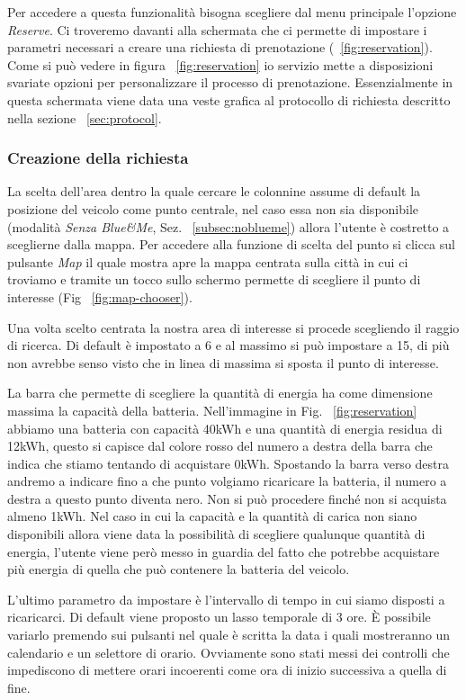 Per accedere a questa funzionalità bisogna scegliere dal menu principale l'opzione \emph{Reserve}. Ci troveremo davanti alla schermata che ci permette di impostare i parametri necessari a creare una richiesta di prenotazione (~\ref{fig:reservation}). Come si può vedere in figura ~\ref{fig:reservation} io servizio mette a disposizioni svariate opzioni per personalizzare il processo di prenotazione. Essenzialmente in questa schermata viene data una veste grafica al protocollo di richiesta descritto nella sezione ~\ref{sec:protocol}.

\subsubsection{Creazione della richiesta}

La scelta dell'area dentro la quale cercare le colonnine assume di default la posizione del veicolo come punto centrale, nel caso essa non sia disponibile (modalità \emph{Senza Blue\&{}Me}, Sez. ~\ref{subsec:noblueme}) allora l'utente è costretto a sceglierne dalla mappa. Per accedere alla funzione di scelta del punto si clicca sul pulsante \emph{Map} il quale mostra apre la mappa centrata sulla città in cui ci troviamo e tramite un tocco sullo schermo permette di scegliere il punto di interesse (Fig ~\ref{fig:map-chooser}).

Una volta scelto centrata la nostra area di interesse si procede scegliendo il raggio di ricerca. Di default è impostato a 6 e al massimo si può impostare a 15, di più non avrebbe senso visto che in linea di massima si sposta il punto di interesse.

La barra che permette di scegliere la quantità di energia ha come dimensione massima la capacità della batteria. Nell'immagine in Fig. ~\ref{fig:reservation} abbiamo una batteria con capacità 40kWh e una quantità di energia residua di 12kWh, questo si capisce dal colore rosso del numero a destra della barra che indica che stiamo tentando di acquistare 0kWh. Spostando la barra verso destra andremo a indicare fino a che punto volgiamo ricaricare la batteria, il numero a destra a questo punto diventa nero. Non si può procedere finché non si acquista almeno 1kWh. 
Nel caso in cui la capacità e la quantità di carica non siano disponibili allora viene data la possibilità di scegliere qualunque quantità di energia, l'utente viene però messo in guardia del fatto che potrebbe acquistare più energia di quella che può contenere la batteria del veicolo.

L'ultimo parametro da impostare è l'intervallo di tempo in cui siamo disposti a ricaricarci. Di default viene proposto un lasso temporale di 3 ore. È possibile variarlo premendo sui pulsanti nel quale è scritta la data i quali mostreranno un calendario e un selettore di orario. Ovviamente sono stati messi dei controlli che impediscono di mettere orari incoerenti come ora di inizio successiva a quella di fine.

